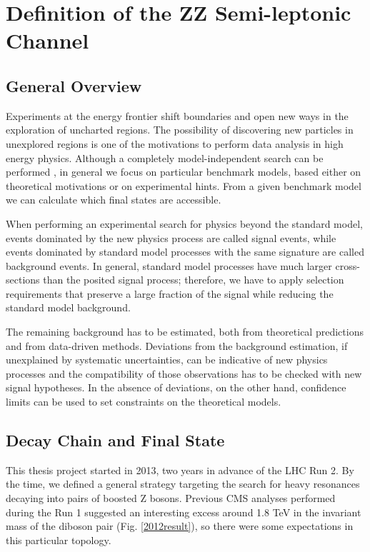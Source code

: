 \chapter{Definition of the ZZ Semi-leptonic Channel}
\section{General Overview}

Experiments at the energy frontier shift boundaries and open new ways in the exploration of uncharted regions. The possibility of discovering new particles in unexplored regions is one of the motivations to perform data analysis in high energy physics. Although a completely model-independent search can be performed \cite{CMS-PAS-EXO-14-016}, in general we focus on particular benchmark models, based either on theoretical motivations or on experimental hints. From a given benchmark model we can calculate which final states are accessible.%

When performing an experimental search for physics beyond the standard model, events dominated by the new physics process are called signal events, while events dominated by standard model processes with the same signature are called background events. In general, standard model processes have much larger cross-sections than the posited signal process; therefore, we have to apply selection requirements that preserve a large fraction of the signal while reducing the standard model background. 

The remaining background has to be estimated, both from theoretical predictions and from data-driven methods. Deviations from the background estimation, if unexplained by systematic uncertainties, can be indicative of new physics processes and the compatibility of those observations has to be checked with new signal hypotheses. In the absence of deviations, on the other hand, confidence limits can be used to set constraints on the theoretical models. 

\section{Decay Chain and Final State}

This thesis project started in 2013, two years in advance of the LHC Run 2. By the time, we defined a general strategy targeting the search for heavy resonances decaying into pairs of boosted Z bosons. Previous CMS analyses performed during the Run 1 \cite{Khachatryan:2014gha} suggested an interesting excess around 1.8 TeV in the invariant mass of the diboson pair (Fig. \ref{2012result}), so there were some expectations in this particular topology.   

